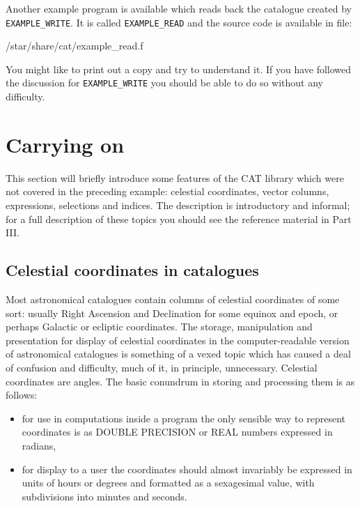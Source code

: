 \documentclass[11pt,twoside]{starlink}
\begin{document}
Another example program is available which reads back the catalogue
created by \texttt{EXAMPLE\_WRITE}. It is called \texttt{EXAMPLE\_READ}
and the source code is available in file:

\begin{terminalv}
/star/share/cat/example_read.f
\end{terminalv}

You might like to print out a copy and try to understand it. If you
have followed the discussion for \texttt{EXAMPLE\_WRITE} you should be
able to do so without any difficulty.


\section{Carrying on}

This section will briefly introduce some features of the CAT library
which were not covered in the preceding example: celestial coordinates,
vector columns, expressions, selections and indices. The description is
introductory and informal; for a full description of these topics you
should see the reference material in Part III.


\subsection{Celestial coordinates in catalogues}

Most astronomical catalogues contain columns of celestial
coordinates of some sort: usually Right Ascension and
Declination for some equinox and epoch, or perhaps Galactic or
ecliptic coordinates. The storage, manipulation and presentation
for display of celestial coordinates in the computer-readable
version of astronomical catalogues is something of a vexed topic
which has caused a deal of confusion and difficulty, much of it,
in principle, unnecessary. Celestial coordinates are angles. The
basic conundrum in storing and processing them is as follows:

\begin{itemize}

  \item for use in computations inside a program the only
  sensible way to represent coordinates is as DOUBLE PRECISION or
  REAL numbers expressed in radians,

  \item for display to a user the coordinates should almost
   invariably be expressed in units of hours or degrees and
   formatted as a sexagesimal value, with subdivisions into minutes
   and seconds.

\end{itemize}
\end{document}
